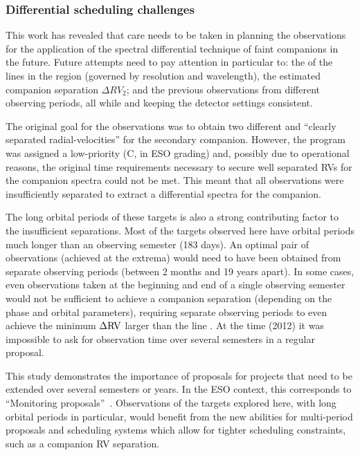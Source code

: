 

\subsubsection{Differential scheduling challenges}
\label{subsubsec:differential-schedualing}
This work has revealed that care needs to be taken in planning the observations for the application of the spectral differential technique of faint companions in the future.
Future attempts need to pay attention in particular to: the {\fwhm} of the lines in the region (governed by resolution and wavelength), the estimated companion separation \(\Delta {RV}_2\); and the previous observations from different observing periods, all while and keeping the detector settings consistent.

The original goal for the observations was to obtain two different and ``clearly separated radial-velocities'' for the secondary companion.
However, the program was assigned a low-priority (C, in {ESO} grading) and, possibly due to operational reasons, the original time requirements necessary to secure well separated {RV}s for the companion spectra could not be met.
This meant that all observations were insufficiently separated to extract a differential spectra for the companion.

The long orbital periods of these targets is also a strong contributing factor to the insufficient separations.
Most of the targets observed here have orbital periods much longer than an observing semester (183 days).
An optimal pair of observations (achieved at the extrema) would need to have been obtained from separate observing periods (between 2 months and 19 years apart).
In some cases, even observations taken at the beginning and end of a single observing semester would not be sufficient to achieve a companion separation (depending on the phase and orbital parameters), requiring separate observing periods to even achieve the minimum \(\Delta \rm {RV}\) larger than the line {\fwhm}.
At the time (2012) it was impossible to ask for observation time over several semesters in a regular proposal.

This study demonstrates the importance of proposals for projects that need to be extended over several semesters or years.
In the {ESO} context, this corresponds to ``Monitoring proposals''~\citep[e.g.][pg.~18]{eso_eso_2017}.
Observations of the targets explored here, with long orbital periods in particular, would benefit from the new abilities for multi-period proposals and scheduling systems which allow for tighter scheduling constraints, such as a companion {RV} separation.

